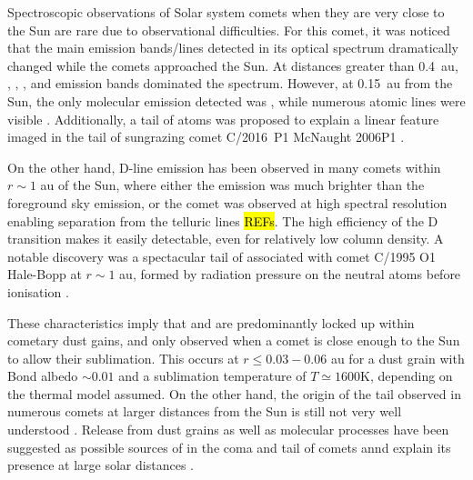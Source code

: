 \documentclass{aa}
\begin{document}
Spectroscopic observations of Solar system comets when they are very close to the Sun are rare due to observational difficulties.
%
%
%
%
For this comet, it was noticed that the main emission bands/lines detected in its optical spectrum dramatically changed while the comets approached the Sun.
%
At distances greater than 0.4~au, , , , and  emission bands dominated the spectrum.
%
However, at 0.15~au from the Sun, the only molecular emission detected was , while numerous atomic lines were visible \citep[, , , , , , , , , ; ][]{Dufay65,Thackeray1966,Preston1967,Slaughter1969}.
%
Additionally, a tail of  atoms was proposed to explain a linear feature imaged in the tail of sungrazing comet C/2016~P1 McNaught 2006P1 \citep{Fulle2007}. 

On the other hand,  D-line emission has been observed in many comets within $r \sim 1$ au of the Sun, where either the emission was much brighter than the foreground sky emission, or the comet was observed at high spectral resolution enabling separation from the telluric lines \hl{REFs}.
%
The high efficiency of the  D transition makes it easily detectable, even for relatively low column density.
%
A notable discovery was a spectacular tail of  associated with comet C/1995 O1 Hale-Bopp at $r\sim 1$ au, formed by radiation pressure on the neutral atoms before ionisation \citep{Cremonese1997}. 

These characteristics imply that  and  are predominantly locked up within cometary dust gains, and only observed when a comet is close enough to the Sun to allow their sublimation.
%
This occurs at $r\leq 0.03-0.06$ au for a dust grain with Bond albedo $\sim0.01$ and a sublimation temperature of $T\simeq 1600$K, depending on the thermal model assumed.
%
On the other hand, the origin of the  tail observed in numerous comets at larger distances from the Sun is still not very well understood \citep{Cremonese02}.
%
Release from dust grains as well as molecular processes have been suggested as possible sources of  in the coma and tail of comets annd explain its presence at large solar distances \citep{Cremonese1997}.
\end{document}
